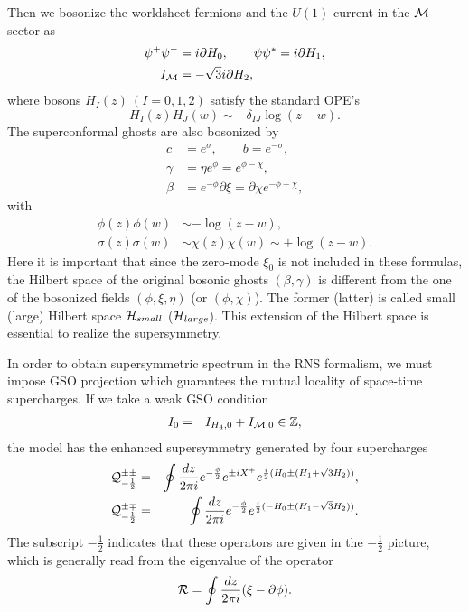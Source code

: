 \documentclass[a4paper,seceq,preprint]{ptptex}
\newcommand{\dz}{\frac{dz}{2\pi i}}
\begin{document}
Then we bosonize the worldsheet fermions and the $U(1)$
current in the ${\cal M}$ sector as
\begin{subequations}\label{bp}
\begin{align}
 \psi^+\psi^-&=i\partial H_0,\qquad
 \psi\psi^*=i\partial H_1,\\
 I_{\cal M}&=-\sqrt{3}i\partial H_2,\label{h2}
\end{align}
\end{subequations}
where bosons $H_I(z)\ (I=0,1,2)$ satisfy
the standard OPE's
\begin{equation}
 H_I(z)H_J(w)\sim -\delta_{IJ}\log(z-w).
\end{equation}
The superconformal ghosts are also bosonized by\cite{FMS}
\begin{align}
 c&=e^\sigma,\qquad b=e^{-\sigma},\nonumber\\
 \gamma&=\eta e^\phi=e^{\phi-\chi},\nonumber\\
 \beta&=e^{-\phi}\partial\xi=\partial\chi e^{-\phi+\chi},
\label{bg}
\end{align}
with
\begin{align}
 \phi(z)\phi(w)&\sim-\log(z-w),\nonumber\\
 \sigma(z)\sigma(w)&\sim\chi(z)\chi(w)\sim+\log(z-w).
\end{align}
Here it is important that since the zero-mode $\xi_0$ is
not included in these formulas, the Hilbert space of 
the original bosonic ghosts $(\beta,\gamma)$ is different 
from the one of the bosonized fields $(\phi,\xi,\eta)$ 
(or $(\phi,\chi)$). The former (latter) is called small 
(large) Hilbert space ${\cal H}_{small}$ 
(${\cal H}_{large}$). This extension of 
the Hilbert space is essential to realize
the supersymmetry.

In order to obtain supersymmetric spectrum
in the RNS formalism, we must impose GSO projection which
guarantees the mutual locality of space-time supercharges.
If we take a weak GSO condition
\begin{eqnarray}
I_0&=&I_{H_4,0}+I_{{\cal M},0} \in \mathbb Z,\label{gso}
\end{eqnarray}
the model has the enhanced supersymmetry 
generated by four supercharges\cite{HS2}
\begin{eqnarray}
 {\cal Q}^{\pm\pm}_{-\frac{1}{2}}&=&\oint\dz
e^{-\frac{\phi}{2}}
e^{\pm iX^+}e^{\frac{i}{2}(H_0\pm(H_1+\sqrt{3}H_2))},\nonumber\\
 {\cal Q}^{\pm\mp}_{-\frac{1}{2}}&=&\oint\dz
e^{-\frac{\phi}{2}}e^{\frac{i}{2}(-H_0\pm(H_1-\sqrt{3}H_2))}.
\label{susy}
\end{eqnarray}
The subscript $-\frac{1}{2}$ indicates that these operators
are given in the $-\frac{1}{2}$ picture, which is generally
read from the eigenvalue of the operator
\begin{equation}
 {\cal R}=\oint\dz(\xi-\partial\phi).\label{picture}
\end{equation}
\end{document}
